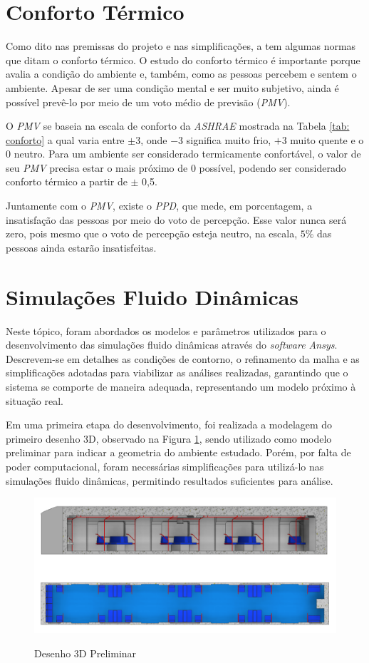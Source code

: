 \documentclass[acronym,symbols,table]{fei}
\begin{document}
\section{Conforto Térmico}

Como dito nas premissas do projeto e nas simplificações, a \textcite{ASHRAE2009} tem algumas normas que ditam o conforto térmico. O estudo do conforto térmico é importante porque avalia a condição do ambiente e, também, como as pessoas percebem e sentem o ambiente. Apesar de ser uma condição mental e ser muito subjetivo, ainda é possível prevê-lo por meio de um voto médio de previsão (\textit{PMV}).

O \textit{PMV} se baseia na escala de conforto da \textit{ASHRAE} mostrada na Tabela \ref{tab: conforto} a qual varia entre $\pm3$, onde $-3$ significa muito frio, $+3$ muito quente e o 0 neutro. Para um ambiente ser considerado termicamente confortável, o valor de seu \textit{PMV} precisa estar o mais próximo de 0 possível, podendo ser considerado conforto térmico a partir de $\pm$ 0,5.

Juntamente com o \textit{PMV}, existe o \textit{PPD}, que mede, em porcentagem, a insatisfação das pessoas por meio do voto de percepção. Esse valor nunca será zero, pois mesmo que o voto de percepção esteja neutro, na escala, $5\%$ das pessoas ainda estarão insatisfeitas.
   
    
\section{Simulações Fluido Dinâmicas} \label{Simulacao}

Neste tópico, foram abordados os modelos e parâmetros utilizados para o desenvolvimento das simulações fluido dinâmicas através do \textit{software Ansys}. Descrevem-se em detalhes as condições de contorno, o refinamento da malha e as simplificações adotadas para viabilizar as análises realizadas, garantindo que o sistema se comporte de maneira adequada, representando um modelo próximo à situação real.

Em uma primeira etapa do desenvolvimento, foi realizada a modelagem do primeiro desenho 3D, observado na Figura \ref{fig:Desenho_Metro}, sendo utilizado como modelo preliminar para indicar a geometria do ambiente estudado. Porém, por falta de poder computacional, foram necessárias simplificações para utilizá-lo nas simulações fluido dinâmicas, permitindo resultados suficientes para análise.

\begin{figure}[!htb]
    \centering
    \caption{Desenho 3D Preliminar}
    \includegraphics[width=0.8\linewidth]{Imagens/Desenho_Metro.png}
    \label{fig:Desenho_Metro}
\end{figure}
\end{document}
